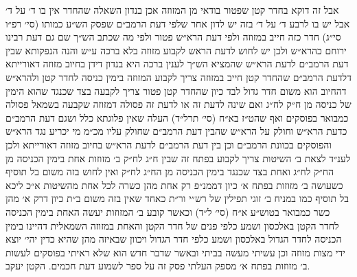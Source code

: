 \documentclass[12pt, openany]{book}
\begin{document}
\begin{multicols}{2}
אבל זה דוקא בחדר קטן שפטור בודאי מן המזוזה אכן בנדון השאלה שהחדר אין בו ד׳ על ד׳ אבל יש בו לרבע ד׳ על ד׳ בזה יש לדון אחר שלפי דעת הרמב״ם שפסק הש״ע כמותו (סי׳ רפ״ו סי״ג) חדר כזה חייב במזוזה ולפי דעת הרא״ש פטור ולפי מה שכתב הש״ך שם גם דעת רבינו ירוחם כהרא״ש ולכן יש לחוש לדעת הראש לקבוע מזוזה בלא ברכה ע״ש והנה הנפקותא שבין דעת הרמב״ם לדעת הרא״ש שהמציא הש״ך לענין ברכה היא בנדון דידן בחיוב מזוזה דאורייתא דלדעת הרמב״ם שהחדר קטן חייב במזוזה צריך לקבוע המזוזה בימין כניסה לחדר קטן ולהרא״ש דהחיוב הוא משום חדר גדול לבד כיון שהחדר קטן פטור צריך לקבעה בצד שכנגד שהוא הימין של כניסה מן ח״ק לח״ג ואם שינה לדעת זה או לדעת זה פסולה דמזוזה שקבעה בשמאל פסולה כמבואר בפוסקים ואף שהט״ז בא״ח (סי׳ תרל״ד) העלה שאין פלוגתא כלל ושגם דעת הרמב״ם כדעת הרא״ש וחולק על הרא״ש שהבין דעת הרמב״ם שחולק עליו מכ״מ מי יכריע נגד הרא״ש והפוסקים בכוונת הרמב״ם וכן בין דעת הרמב״ם לדעת הרא״ש בחיוב מזוזה דאורייתא ולכן לענ״ד לצאת ב׳ השיטות צריך לקבוע בפתח זה שבין ח״ג לח״ק ב׳ מזוזות אחת בימין הכניסה מן הח״ק לח״ג ואחת בצד שכנגד בימין הכניסה מן הח״ג לח״ק ואין לחוש בזה משום בל תוסיף כשעושה ב׳ מזוזות בפתח א׳ כיון דממנ״פ רק אחת מהן כשרה לכל אחת מהשיטות א״כ ליכא בל תוסיף כמו במניח ב׳ זוגי תפילין של רש״י ור״ת כאחד שאין בזה משום ב״ת כיון דרק א׳ מהן כשר כמבואר בטוש״ע א״ח (סי׳ ל״ד) וכאשר קובע ב׳ המזוזות יעשה האחת בימין הכניסה לחדר הקטן באלכסון ושמע כלפי פנים של חדר הקטן והאחת במזוזה השמאלית דהיינו בימין הכניסה לחדר הגדול באלכסון ושמע כלפי חדר הגדול ויכוון שבאיזה מהן שהיא כדין יהי׳ יוצא ידי מצות מזוזה וכן עשיתי מעשה בביתי ובאשר שדבר חדש הוא שלא ראיתי בפוסקים לעשות ב׳ מזוזות בפתח א׳ מספק העלתי פסק זה על ספר לשמוע דעת חכמים. הקטן יעקב.\\\vspace{0pt}

\end{multicols}\newpage
\end{document}
